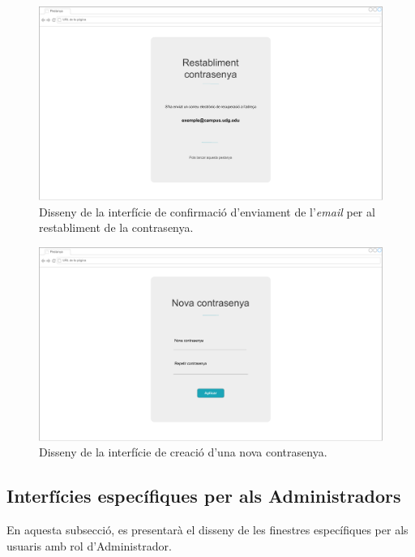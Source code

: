 \documentclass[a4paper,12pt]{ThesisStyle}
\begin{document}
\begin{figure}[H]
	\centering
	\includegraphics[width=\textwidth]{assets/interfaces/login/passwordRestablished.pdf}
	\caption{\label{img:passwordRestablished}Disseny de la interfície de confirmació d'enviament de l'\textit{email} per al restabliment de la contrasenya.}
\end{figure}

\begin{figure}[H]
	\centering
	\includegraphics[width=\textwidth]{assets/interfaces/login/newPassword.pdf}
	\caption{\label{img:newPassword}Disseny de la interfície de creació d'una nova contrasenya.}
\end{figure}

\subsection{Interfícies específiques per als Administradors}
\label{subsec:interficies_administradors}

En aquesta subsecció, es presentarà el disseny de les finestres específiques per als usuaris amb rol d'Administrador.
\end{document}
